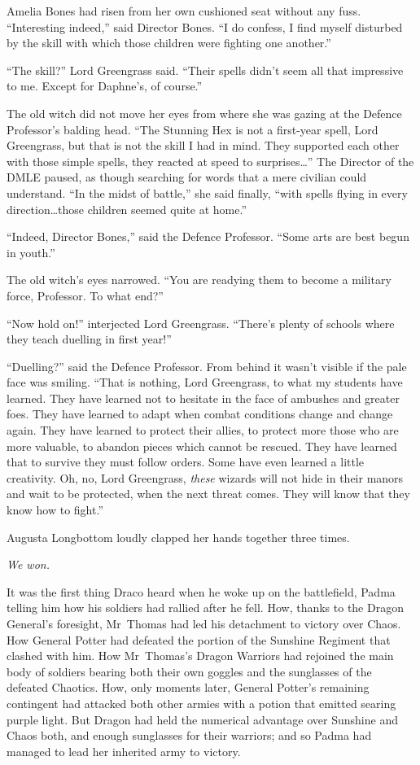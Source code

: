 Amelia Bones had risen from her own cushioned seat without any fuss. “Interesting indeed,” said Director Bones. “I do confess, I find myself disturbed by the skill with which those children were fighting one another.”

“The skill?” Lord Greengrass said. “Their spells didn’t seem all that impressive to me. Except for Daphne’s, of course.”

The old witch did not move her eyes from where she was gazing at the Defence Professor’s balding head. “The Stunning Hex is not a first-year spell, Lord Greengrass, but that is not the skill I had in mind. They supported each other with those simple spells, they reacted at speed to surprises…” The Director of the DMLE paused, as though searching for words that a mere civilian could understand. “In the midst of battle,” she said finally, “with spells flying in every direction…those children seemed quite at home.”

“Indeed, Director Bones,” said the Defence Professor. “Some arts are best begun in youth.”

The old witch’s eyes narrowed. “You are readying them to become a military force, Professor. To what end?”

“Now hold on!” interjected Lord Greengrass. “There’s plenty of schools where they teach duelling in first year!”

“Duelling?” said the Defence Professor. From behind it wasn’t visible if the pale face was smiling. “That is nothing, Lord Greengrass, to what my students have learned. They have learned not to hesitate in the face of ambushes and greater foes. They have learned to adapt when combat conditions change and change again. They have learned to protect their allies, to protect more those who are more valuable, to abandon pieces which cannot be rescued. They have learned that to survive they must follow orders. Some have even learned a little creativity. Oh, no, Lord Greengrass, \emph{these} wizards will not hide in their manors and wait to be protected, when the next threat comes. They will know that they know how to fight.”

Augusta Longbottom loudly clapped her hands together three times.

\later

\emph{We won.}

It was the first thing Draco heard when he woke up on the battlefield, Padma telling him how his soldiers had rallied after he fell. How, thanks to the Dragon General’s foresight, Mr~Thomas had led his detachment to victory over Chaos. How General Potter had defeated the portion of the Sunshine Regiment that clashed with him. How Mr~Thomas’s Dragon Warriors had rejoined the main body of soldiers bearing both their own goggles and the sunglasses of the defeated Chaotics. How, only moments later, General Potter’s remaining contingent had attacked both other armies with a potion that emitted searing purple light. But Dragon had held the numerical advantage over Sunshine and Chaos both, and enough sunglasses for their warriors; and so Padma had managed to lead her inherited army to victory.

